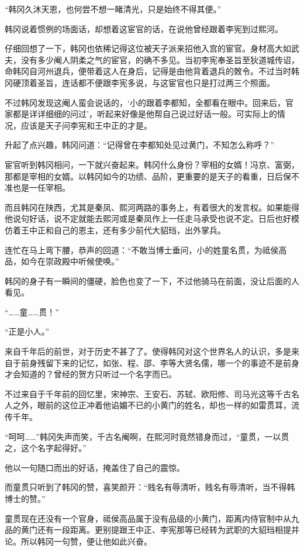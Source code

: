 “韩冈久沐天恩，也何尝不想一睹清光，只是始终不得其便。”

韩冈说着惯例的场面话，却想着这宦官的话，在说他曾经跟着李宪到过熙河。

仔细回想了一下，韩冈也依稀记得这位被天子派来招他入宫的宦官。身材高大如武夫，没有多少阉人阴柔之气的宦官，的确不多见。当初李宪奉圣旨至狄道城传诏，命韩冈自河州退兵，便带着这人在身后，记得是由他背着退兵的敇令。不过当时韩冈硬顶着圣旨，连话都不便跟李宪多说，与这宦官也只是打过两三个照面。

不过韩冈发现这阉人蛮会说话的，‘小的跟着李都知，全都看在眼中。回来后，官家都是详详细细的问过’，听起来好像是他帮自己说过好话一般。可实际上的情况，应该是天子问李宪和王中正的才是。

升起了点兴趣，韩冈问道：“记得曾在李都知处见过黄门，不知怎么称呼？”

宦官听到韩冈相问，一下就兴奋起来。韩冈什么身份？宰相的女婿！冯京、富弼，那都是宰相的女婿。以韩冈如今的功绩、品阶，更重要的是天子的看重，日后保不准也是一任宰相。

而且韩冈在陕西，尤其是秦凤、熙河两路的事务上，有着很大的发言权。如果能得他说句好话，说不定就能去熙河或是秦凤作上一任走马承受也说不定。日后也好模仿着王中正和自己的恩主，还有多少前代大貂珰，出外掌兵。

连忙在马上弯下腰，恭声的回道：“不敢当博士垂问，小的姓童名贯，为祗侯高品，如今在崇政殿中听候使唤。”

韩冈的身子有一瞬间的僵硬，脸色也变了一下，不过他骑马在前面，没让后面的人看见。

“……童……贯！”

“正是小人。”

来自千年后的前世，对于历史不甚了了。使得韩冈对这个世界名人的认识，多是来自于前身残留下来的记忆，如张、程、邵、李等大贤名儒，哪一个的事迹不是前身才会知道的？曾经的贺方只听过一个名字而已。

不过来自于千年前的回忆里，宋神宗、王安石、苏轼、欧阳修、司马光这等千古名人之外，眼前的这位正冲着他谄媚不已的小黄门的姓名，却也一样的如雷贯耳，流传千年。

“呵呵……”韩冈失声而笑，千古名阉啊，在熙河时竟然错身而过，“童贯，一以贯之，这个名字起得好。”

他以一句随口而出的好话，掩盖住了自己的震惊。

而童贯只听到了韩冈的赞，喜笑颜开：“贱名有辱清听，贱名有辱清听，当不得韩博士的赞。”

童贯现在还没有一个官身，祗侯高品属于没有品级的小黄门，距离内侍官制中从九品的黄门还有一段距离。更别提跟王中正、李宪那等已经转为武职的大貂珰相提并论。所以韩冈一句赞，便让他如此兴奋。

